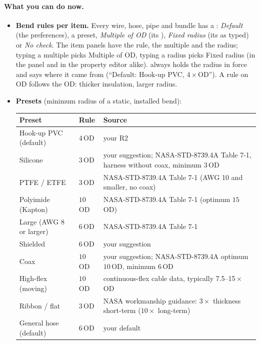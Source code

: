 \paragraph{What you can do now.}
\begin{itemize}[nosep]
  \item \textbf{Bend rules per item.} Every wire, hose, pipe and bundle has a : \emph{Default} (the
        preferences), a preset, \emph{Multiple of OD} (its ), \emph{Fixed radius} (its
         as typed) or \emph{No check}. The item panels have the rule, the multiple and the radius;
        typing a multiple picks Multiple of OD, typing a radius picks Fixed radius (in the panel and in the property
        editor alike).  always holds the radius in force and  says where it came
        from (``Default: Hook-up PVC, 4\,$\times$\,OD''). A rule on OD follows the OD: thicker insulation, larger radius.
  \item \textbf{Presets} (minimum radius of a static, installed bend):
        \begin{center}\small
        \begin{tabularx}{\linewidth}{@{}llX@{}}
        \toprule
        Preset & Rule & Source \\
        \midrule
        Hook-up PVC (default) & $4\,$OD & your R2 \\
        Silicone & $3\,$OD & your suggestion; NASA-STD-8739.4A Table 7-1, harness without coax, minimum $3\,$OD \\
        PTFE / ETFE & $3\,$OD & NASA-STD-8739.4A Table 7-1 (AWG 10 and smaller, no coax) \\
        Polyimide (Kapton) & $10\,$OD & NASA-STD-8739.4A Table 7-1 (optimum $15\,$OD) \\
        Large (AWG 8 or larger) & $6\,$OD & NASA-STD-8739.4A Table 7-1 \\
        Shielded & $6\,$OD & your suggestion \\
        Coax & $10\,$OD & your suggestion; NASA-STD-8739.4A optimum $10\,$OD, minimum $6\,$OD \\
        High-flex (moving) & $10\,$OD & continuous-flex cable data, typically 7.5--15\,$\times$\,OD \\
        Ribbon / flat & $3\,$OD & NASA workmanship guidance: $3\times$ thickness short-term ($10\times$ long-term) \\
        General hose (default) & $6\,$OD & your default \\

\end{tabularx}
\end{center}
\end{itemize}
